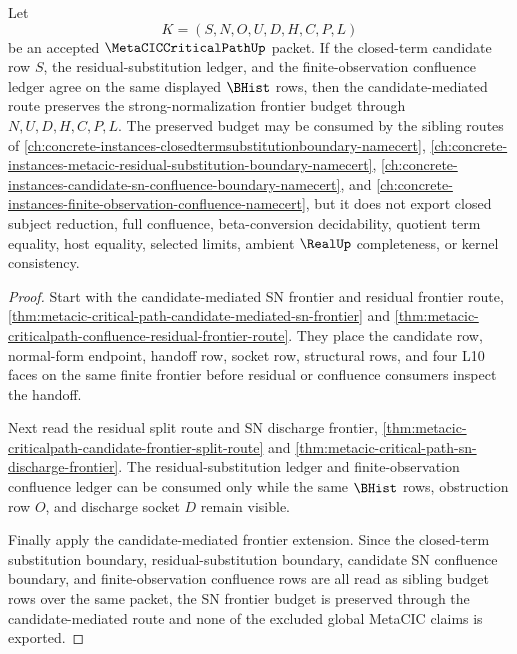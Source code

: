 \begin{theorem}
\label{thm:metacic-criticalpath-candidate-mediated-sn-residual-boundary}
Let
$$
K=(S,N,O,U,D,H,C,P,L)
$$
be an accepted $\MetaCICCriticalPathUp$ packet. If the closed-term candidate row $S$, the residual-substitution ledger, and the finite-observation confluence ledger agree on the same displayed $\BHist$ rows, then the candidate-mediated route preserves the strong-normalization frontier budget through $N,U,D,H,C,P,L$. The preserved budget may be consumed by the sibling routes of \autoref{ch:concrete-instances-closedtermsubstitutionboundary-namecert}, \autoref{ch:concrete-instances-metacic-residual-substitution-boundary-namecert}, \autoref{ch:concrete-instances-candidate-sn-confluence-boundary-namecert}, and \autoref{ch:concrete-instances-finite-observation-confluence-namecert}, but it does not export closed subject reduction, full confluence, beta-conversion decidability, quotient term equality, host equality, selected limits, ambient $\RealUp$ completeness, or kernel consistency.
\end{theorem}
\begin{proof}
Start with the candidate-mediated SN frontier and residual frontier route, \autoref{thm:metacic-critical-path-candidate-mediated-sn-frontier} and \autoref{thm:metacic-criticalpath-confluence-residual-frontier-route}. They place the candidate row, normal-form endpoint, handoff row, socket row, structural rows, and four L10 faces on the same finite frontier before residual or confluence consumers inspect the handoff.

Next read the residual split route and SN discharge frontier, \autoref{thm:metacic-criticalpath-candidate-frontier-split-route} and \autoref{thm:metacic-critical-path-sn-discharge-frontier}. The residual-substitution ledger and finite-observation confluence ledger can be consumed only while the same $\BHist$ rows, obstruction row $O$, and discharge socket $D$ remain visible.

Finally apply the candidate-mediated frontier extension. Since the closed-term substitution boundary, residual-substitution boundary, candidate SN confluence boundary, and finite-observation confluence rows are all read as sibling budget rows over the same packet, the SN frontier budget is preserved through the candidate-mediated route and none of the excluded global MetaCIC claims is exported.
\end{proof}
